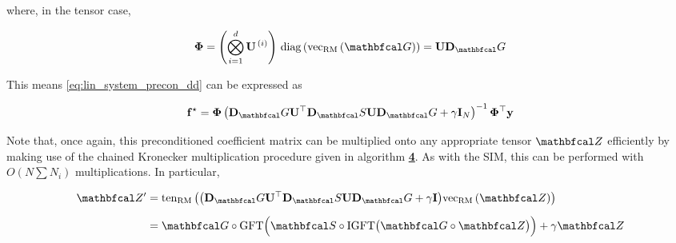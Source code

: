 where, in the tensor case, 

\begin{equation}
    \PHI = \left( \bigotimes_{i=1}^d  \U^{\,(i)} \right) \, \diag{\vecrm{\Gt}} = \U \D_\Gt
\end{equation}

This means \cref{eq:lin_system_precon_dd} can be expressed as 

\begin{equation}
    \f^{\star} = \PHI \left( \D_\Gt \U^\top \D_\St \U \D_\Gt + \gamma \I_N \right)^{-1}\PHI^\top \y
\end{equation}

Note that, once again, this preconditioned coefficient matrix can be multiplied onto any appropriate tensor $\Zt$ efficiently by making use of the chained Kronecker multiplication procedure given in algorithm \hyperlink{KronMatMul}{\textbf{4}}. As with the SIM, this can be performed with $O(N \sum N_i)$ multiplications. In particular, 

\begin{align*}
    \Zt' &= \tenrm{\big( \D_\Gt \U^\top \D_\St \U \D_\Gt + \gamma \I \big) \vecrm{\Zt}} \\[0.2cm]
    &= \Gt \circ \text{GFT} \Big( \St \circ \text{IGFT} \big(\Gt \circ \Zt\big) \Big)  + \gamma \Zt
\end{align*}


